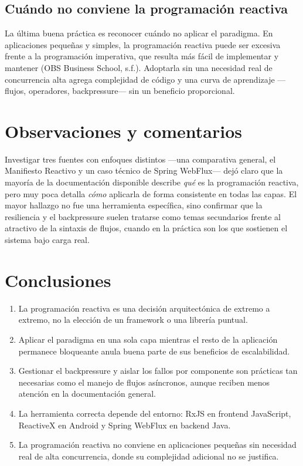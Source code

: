 \documentclass[
  spanish,
  12pt,
  letterpaper,
]{article}
\providecommand{\tightlist}{%
  \setlength{\itemsep}{0pt}\setlength{\parskip}{0pt}}
\begin{document}
\subsection{Cuándo no conviene la programación
reactiva}\label{cuuxe1ndo-no-conviene-la-programaciuxf3n-reactiva}

La última buena práctica es reconocer cuándo no aplicar el paradigma. En
aplicaciones pequeñas y simples, la programación reactiva puede ser
excesiva frente a la programación imperativa, que resulta más fácil de
implementar y mantener (OBS Business School, s.f.). Adoptarla sin una
necesidad real de concurrencia alta agrega complejidad de código y una
curva de aprendizaje ---flujos, operadores, backpressure--- sin un
beneficio proporcional.

\section{Observaciones y comentarios}\label{observaciones-y-comentarios}

Investigar tres fuentes con enfoques distintos ---una comparativa
general, el Manifiesto Reactivo y un caso técnico de Spring WebFlux---
dejó claro que la mayoría de la documentación disponible describe
\emph{qué} es la programación reactiva, pero muy poca detalla
\emph{cómo} aplicarla de forma consistente en todas las capas. El mayor
hallazgo no fue una herramienta específica, sino confirmar que la
resiliencia y el backpressure suelen tratarse como temas secundarios
frente al atractivo de la sintaxis de flujos, cuando en la práctica son
los que sostienen el sistema bajo carga real.

\section{Conclusiones}\label{conclusiones}

\begin{enumerate}
\def\labelenumi{\arabic{enumi}.}
\tightlist
\item
  La programación reactiva es una decisión arquitectónica de extremo a
  extremo, no la elección de un framework o una librería puntual.
\item
  Aplicar el paradigma en una sola capa mientras el resto de la
  aplicación permanece bloqueante anula buena parte de sus beneficios de
  escalabilidad.
\item
  Gestionar el backpressure y aislar los fallos por componente son
  prácticas tan necesarias como el manejo de flujos asíncronos, aunque
  reciben menos atención en la documentación general.
\item
  La herramienta correcta depende del entorno: RxJS en frontend
  JavaScript, ReactiveX en Android y Spring WebFlux en backend Java.
\item
  La programación reactiva no conviene en aplicaciones pequeñas sin
  necesidad real de alta concurrencia, donde su complejidad adicional no
  se justifica.
\end{enumerate}
\end{document}
